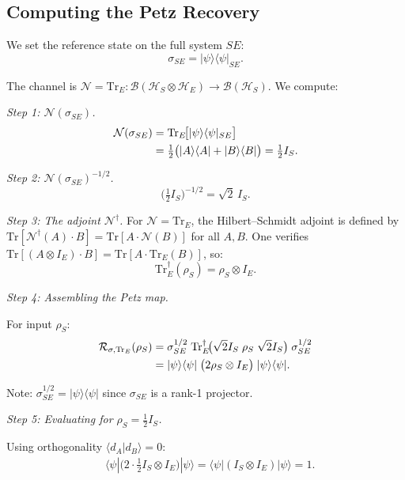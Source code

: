 \documentclass[prl,twocolumn,superscriptaddress,longbibliography]{revtex4-2}
\newcommand{\Tr}{\mathrm{Tr}}
\newcommand{\Petz}{\mathcal{R}}
\newcommand{\chan}{\mathcal{N}}
\newcommand{\hilb}{\mathcal{H}}
\newcommand{\ket}[1]{|#1\rangle}
\newcommand{\bra}[1]{\langle#1|}
\newcommand{\braket}[2]{\langle#1|#2\rangle}
\begin{document}
\subsection{Computing the Petz Recovery}

We set the reference state on the full system $SE$:
\begin{equation}
\sigma_{SE} = \ket{\psi}\bra{\psi}_{SE}.
\end{equation}

The channel is $\chan = \Tr_E: \mathcal{B}(\hilb_S \otimes \hilb_E)
\to \mathcal{B}(\hilb_S)$. We compute:

\emph{Step 1: $\chan(\sigma_{SE})$.}
\begin{align}
\chan(\sigma_{SE}) &= \Tr_E\!\big[\ket{\psi}\bra{\psi}_{SE}\big]
\notag\\
&= \tfrac{1}{2}\big(\ket{A}\bra{A} + \ket{B}\bra{B}\big)
= \tfrac{1}{2}I_S.
\end{align}

\emph{Step 2: $\chan(\sigma_{SE})^{-1/2}$.}
\begin{equation}
\big(\tfrac{1}{2}I_S\big)^{-1/2} = \sqrt{2}\,I_S.
\end{equation}

\emph{Step 3: The adjoint $\chan^\dagger$.}
For $\chan = \Tr_E$, the Hilbert--Schmidt adjoint is defined by
$\Tr[\chan^\dagger(A) \cdot B] = \Tr[A \cdot \chan(B)]$ for all $A,B$.
One verifies $\Tr[(A \otimes I_E) \cdot B] = \Tr[A \cdot \Tr_E(B)]$,
so:
\begin{equation}
\Tr_E^\dagger(\rho_S) = \rho_S \otimes I_E.
\end{equation}

\emph{Step 4: Assembling the Petz map.}

For input $\rho_S$:
\begin{align}
\Petz_{\sigma,\Tr_E}(\rho_S)
&= \sigma_{SE}^{1/2}\;\Tr_E^\dagger\!\big(
  \sqrt{2}I_S\;\rho_S\;\sqrt{2}I_S
\big)\;\sigma_{SE}^{1/2} \notag\\
&= \ket{\psi}\bra{\psi}\;\big(2\rho_S \otimes
  I_E\big)\;\ket{\psi}\bra{\psi}.
\label{eq:petz_eraser}
\end{align}

Note: $\sigma_{SE}^{1/2} = \ket{\psi}\bra{\psi}$ since $\sigma_{SE}$
is a rank-1 projector.

\emph{Step 5: Evaluating for $\rho_S = \frac{1}{2}I_S$.}

Using orthogonality $\braket{d_A}{d_B} = 0$:
\begin{align}
&\bra{\psi}\big(2 \cdot \tfrac{1}{2}I_S \otimes I_E\big)\ket{\psi}
= \bra{\psi}(I_S \otimes I_E)\ket{\psi} = 1.
\end{align}
\end{document}

